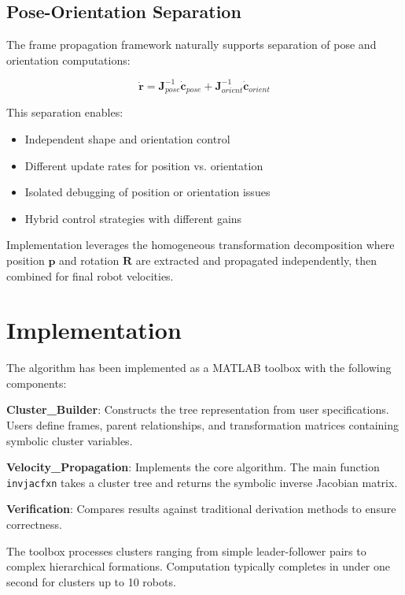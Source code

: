 \documentclass[lettersize,journal]{IEEEtran}
\begin{document}
\subsection{Pose-Orientation Separation}

The frame propagation framework naturally supports separation of pose and orientation computations:

\begin{equation}
\dot{\mathbf{r}} = \mathbf{J}_{pose}^{-1} \dot{\mathbf{c}}_{pose} + \mathbf{J}_{orient}^{-1} \dot{\mathbf{c}}_{orient}
\end{equation}

This separation enables:
\begin{itemize}
\item Independent shape and orientation control
\item Different update rates for position vs. orientation
\item Isolated debugging of position or orientation issues
\item Hybrid control strategies with different gains
\end{itemize}

Implementation leverages the homogeneous transformation decomposition where position $\mathbf{p}$ and rotation $\mathbf{R}$ are extracted and propagated independently, then combined for final robot velocities.

\section{Implementation}

The algorithm has been implemented as a MATLAB toolbox with the following components:

\textbf{Cluster\_Builder}: Constructs the tree representation from user specifications. Users define frames, parent relationships, and transformation matrices containing symbolic cluster variables.

\textbf{Velocity\_Propagation}: Implements the core algorithm. The main function \texttt{invjacfxn} takes a cluster tree and returns the symbolic inverse Jacobian matrix.

\textbf{Verification}: Compares results against traditional derivation methods to ensure correctness.

The toolbox processes clusters ranging from simple leader-follower pairs to complex hierarchical formations. Computation typically completes in under one second for clusters up to 10 robots.
\end{document}
